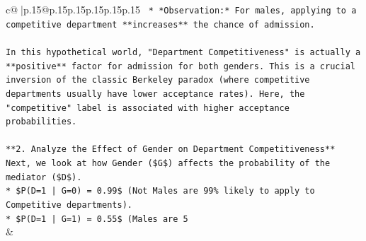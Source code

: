 \documentclass{article}
\begin{document}
{\begin{supertabular}{c@{$\;$}|p{.15\linewidth}@{}p{.15\linewidth}p{.15\linewidth}p{.15\linewidth}p{.15\linewidth}p{.15\linewidth}}
{{{\texttt{    *   *Observation:* For males, applying to a competitive department **increases** the chance of admission.} \\
\\ 
\texttt{In this hypothetical world, "Department Competitiveness" is actually a **positive** factor for admission for both genders. This is a crucial inversion of the classic Berkeley paradox (where competitive departments usually have lower acceptance rates). Here, the "competitive" label is associated with higher acceptance probabilities.} \\
\\ 
\texttt{**2. Analyze the Effect of Gender on Department Competitiveness**} \\
\texttt{Next, we look at how Gender (\$G\$) affects the probability of the mediator (\$D\$).} \\
\texttt{*   \$P(D=1 | G=0) = 0.99\$ (Not Males are 99\% likely to apply to Competitive departments).} \\
\texttt{*   \$P(D=1 | G=1) = 0.55\$ (Males are 5} \\
            }
        }
    }
    & \\ \\


\end{supertabular}}
\end{document}
